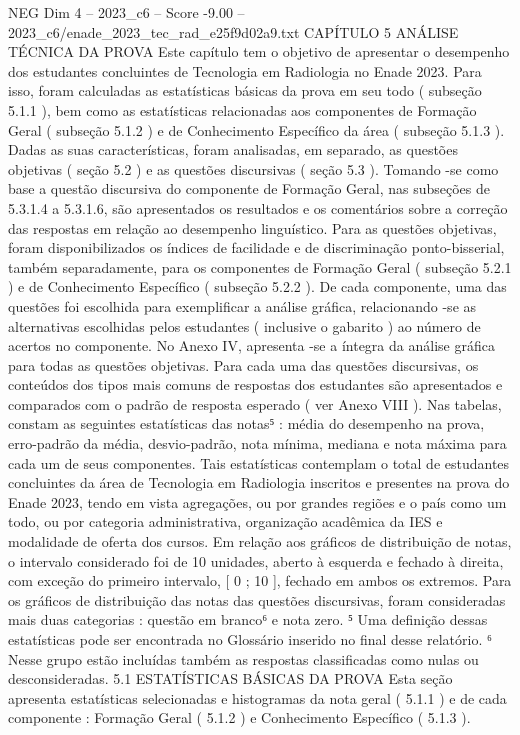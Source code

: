 \begin{textsample}{NEG Dim 4 – 2023\_c6 – Score -9.00 – 2023\_c6/enade\_2023\_tec\_rad\_e25f9d02a9.txt}  \label{ex:f4_neg_016}
CAPÍTULO 5 ANÁLISE TÉCNICA DA PROVA Este capítulo tem o objetivo de apresentar o desempenho dos estudantes concluintes de Tecnologia em Radiologia no Enade 2023.
Para isso, foram calculadas as estatísticas básicas da prova em seu todo ( subseção 5.1.1 ), bem como as estatísticas relacionadas aos componentes de Formação Geral ( subseção 5.1.2 ) e de Conhecimento Específico da área ( subseção 5.1.3 ).
Dadas as suas características, foram analisadas, em separado, as questões objetivas ( seção 5.2 ) e as questões discursivas ( seção 5.3 ).
Tomando -se como base a questão discursiva do componente de Formação Geral, nas subseções de 5.3.1.4 a 5.3.1.6, são apresentados os resultados e os comentários sobre a correção das respostas em relação ao desempenho linguístico.
Para as questões objetivas, foram disponibilizados os índices de facilidade e de discriminação ponto-bisserial, também separadamente, para os componentes de Formação Geral ( subseção 5.2.1 ) e de Conhecimento Específico ( subseção 5.2.2 ).
De cada componente, uma das questões foi escolhida para exemplificar a análise gráfica, relacionando -se as alternativas escolhidas pelos estudantes ( inclusive o gabarito ) ao número de acertos no componente.
No Anexo IV, apresenta -se a íntegra da análise gráfica para todas as questões objetivas.
Para cada uma das questões discursivas, os conteúdos dos tipos mais comuns de respostas dos estudantes são apresentados e comparados com o padrão de resposta esperado ( ver Anexo VIII ).
Nas tabelas, constam as seguintes estatísticas das notas⁵ : média do desempenho na prova, erro-padrão da média, desvio-padrão, nota mínima, mediana e nota máxima para cada um de seus componentes.
Tais estatísticas contemplam o total de estudantes concluintes da área de Tecnologia em Radiologia inscritos e presentes na prova do Enade 2023, tendo em vista agregações, ou por grandes regiões e o país como um todo, ou por categoria administrativa, organização acadêmica da IES e modalidade de oferta dos cursos.
Em relação aos gráficos de distribuição de notas, o intervalo considerado foi de 10 unidades, aberto à esquerda e fechado à direita, com exceção do primeiro intervalo, [ 0 ; 10 ], fechado em ambos os extremos.
Para os gráficos de distribuição das notas das questões discursivas, foram consideradas mais duas categorias : questão em branco⁶ e nota zero. ⁵ Uma definição dessas estatísticas pode ser encontrada no Glossário inserido no final desse relatório. ⁶ Nesse grupo estão incluídas também as respostas classificadas como nulas ou desconsideradas. 5.1 ESTATÍSTICAS BÁSICAS DA PROVA Esta seção apresenta estatísticas selecionadas e histogramas da nota geral ( 5.1.1 ) e de cada componente : Formação Geral ( 5.1.2 ) e Conhecimento Específico ( 5.1.3 ).

\end{textsample}
